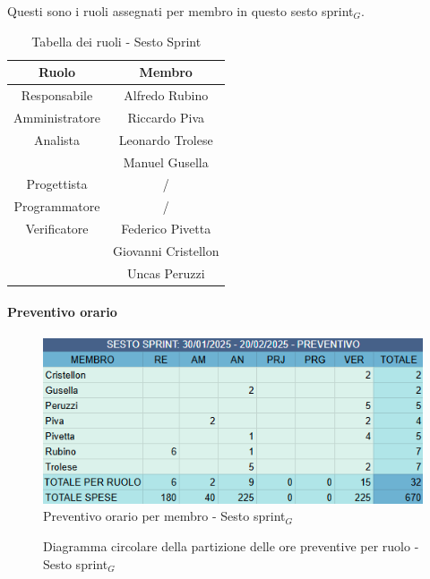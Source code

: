 \documentclass[10pt]{article}
\begin{document}
{{{{{{{    Questi sono i ruoli assegnati per membro in questo sesto sprint$_G$.\\
    \begin{table}[H]
        \centering
        \begin{tabular}{|c|c|}
        \hline
        \rowcolor{gray!25}
        \textbf{Ruolo} & \textbf{Membro}\\
        \hline
        Responsabile & Alfredo Rubino\\
        \hline
        Amministratore & Riccardo Piva \\ 
        \hline
        Analista & Leonardo Trolese \\
        & Manuel Gusella \\
        \hline
        Progettista & / \\
        \hline
        Programmatore & / \\
        \hline
        Verificatore & Federico Pivetta \\
        & Giovanni Cristellon \\
        & Uncas Peruzzi \\
        \hline
        \end{tabular}
        \caption{Tabella dei ruoli - Sesto Sprint}
    \end{table}

    \paragraph{Preventivo orario}\mbox{}\vspace{0.4em}
    \begin{figure}[H]
    	\centering
    	\includegraphics[width=0.6\linewidth]{preventivoOreSestoSprint.PNG}
    	\caption{Preventivo orario per membro - Sesto sprint$_G$}
    	\label{fig:Preventivo orario per membro - Sesto sprint$_G$}
    \end{figure}

    \begin{figure}[H]
        \centering
        \caption{Diagramma circolare della partizione delle ore preventive per ruolo - Sesto sprint$_G$ }
        \label{fig:Diagramma circolare della partizione delle ore preventive per ruolo - Sesto sprint$_G$}
    \end{figure}
    
}}}}}}}
\end{document}
